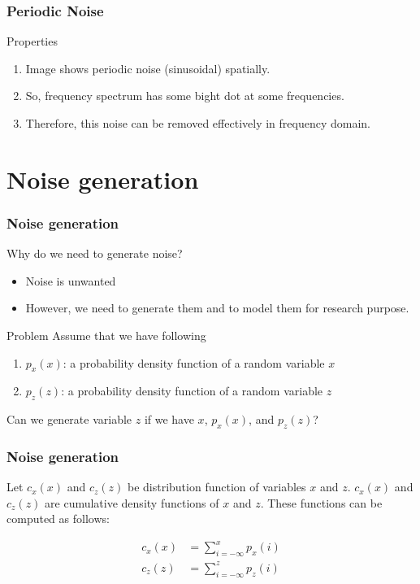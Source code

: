 \documentclass[english,11pt,table,handout]{beamer}
\begin{document}
\frame
{
	\frametitle{Periodic Noise}
	
	\begin{alertblock}{Properties}
		\begin{enumerate}
			\item Image shows periodic noise (sinusoidal) spatially.
			\item So, frequency spectrum has some bight dot at some frequencies.
			\item Therefore, this noise can be removed effectively in frequency domain.
		\end{enumerate}
	\end{alertblock}
}


\section{Noise generation}
\frame
{
	\frametitle{Noise generation}
	
	\begin{alertblock}{Why do we need to generate noise?}
		\begin{itemize}
			\item Noise is unwanted
			\item However, we need to generate them and to model them for research purpose.
		\end{itemize} 
		
	\end{alertblock}

	\begin{block}{Problem}
		Assume that we have following
		\begin{enumerate}
			\item $p_x(x)$: a probability density function of a random variable $x$
			\item $p_z(z)$: a probability density function of a random variable $z$
		\end{enumerate} 
		Can we generate variable $z$ if we have $x$, $p_x(x)$, and $p_z(z)$?
	\end{block}
}
\frame
{
	\frametitle{Noise generation}
	
	Let $c_x(x)$ and $c_z(z)$ be distribution function of variables $x$ and $z$. \newline
	$c_x(x)$ and $c_z(z)$ are cumulative density functions of $x$ and $z$. These functions can be computed as follows:

	\begin{align}
		\nonumber
		c_x(x) &= \sum_{i=-\infty}^{x}{p_x(i)}\\
		\nonumber
		c_z(z) &= \sum_{i=-\infty}^{z}{p_z(i)}
	\end{align}

}
\end{document}

